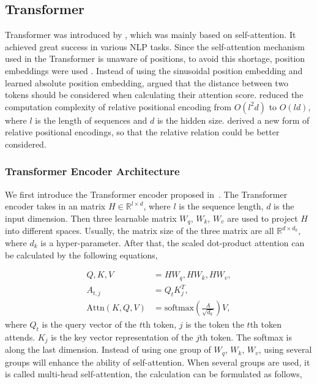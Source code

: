 \documentclass[11pt,a4paper]{article}
\begin{document}
\subsection{Transformer}

Transformer was introduced by \citep{vaswani2017attention}, which was mainly based on self-attention. It achieved great success in various NLP tasks. Since the self-attention mechanism used in the Transformer is unaware of positions, to avoid this shortage, position embeddings were used \cite{vaswani2017attention,DBLP:journals/corr/abs-1810-04805}. Instead of using the sinusoidal position embedding \cite{vaswani2017attention} and learned absolute position embedding, \citet{DBLP:conf/naacl/ShawUV18} argued that the distance between two tokens should be considered when calculating their attention score. \citet{DBLP:conf/iclr/HuangVUSHSDHDE19} reduced the computation complexity of relative positional encoding from $O(l^2d)$ to $O(ld)$, where $l$ is the length of sequences and $d$ is the hidden size. \citet{DBLP:conf/acl/DaiYYCLS19} derived a new form of relative positional encodings, so that the relative relation could be better considered.




\subsubsection{Transformer Encoder Architecture}

We first introduce the Transformer encoder proposed in~\cite{vaswani2017attention}. The Transformer encoder takes in an matrix $H \in \mathbb{R}^{l \times d}$, where $l$ is the sequence length, $d$ is the input dimension. Then three learnable matrix $W_q$, $W_k$, $W_v$ are used to project $H$ into different spaces. Usually, the matrix size of the three matrix are all $\mathbb{R}^{d \times d_k}$, where $d_k$ is a hyper-parameter. After that, the scaled dot-product attention can be calculated by the following equations,

\vspace{-1em}
{\small
  \begin{align}
     Q, K, V & = HW_q, HW_k, HW_v, \label{eq:qkv} \\
     A_{t,j} & = Q_tK_j^T, \label{eq:attn_transformer} \\
     \mathrm{Attn}(K, Q, V) & = \mathrm{softmax}(\frac{A}{\sqrt{d_k}})V, \label{eq:softmax_transformer}
  \end{align}
}where $Q_t$ is the query vector of the $t$th token, $j$ is the token the $t$th token attends. $K_j$ is the key vector representation of the $j$th token.
The softmax is along the last dimension. Instead of using one group of $W_q$, $W_k$, $W_v$, using several groups will enhance the ability of self-attention. When several groups are used, it is called multi-head self-attention, the calculation can be formulated as follows,
\end{document}
